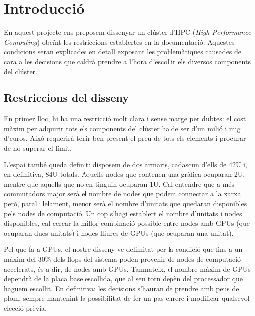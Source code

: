 \section{Introducció}

En aquest projecte ens proposem dissenyar un clúster d'HPC (\textit{High Performance Computing}) obeïnt les restriccions establertes en la documentació. Aquestes condicions seran explicades en detall exposant les problemàtiques causades de cara a les decisions que caldrà prendre a l'hora d'escollir els diversos components del clúster.

\subsection{Restriccions del disseny}
En primer lloc, hi ha una restricció molt clara i sense marge per dubtes: el cost màxim per adquirir tots els components del clúster ha de ser d'un milió i mig d'euros. Això requerirà tenir ben present el preu de tots els elements i procurar de no superar el límit.

L'espai també queda definit: disposem de dos armaris, cadascun d'ells de 42U i, en definitiva, 84U totals. Aquells nodes que contenen una gràfica ocuparan 2U, mentre que aquells que no en tinguin ocuparan 1U. Cal entendre que a més commutadors major serà el nombre de nodes que podem connectar a la xarxa però, paral·lelament, menor serà el nombre d'unitats que quedaran disponibles pels nodes de computació. Un cop s'hagi establert el nombre d'unitats i nodes disponibles, cal cercar la millor combinació possible entre nodes amb GPUs (que ocuparan dues unitats) i nodes lliures de GPUs (que ocuparan una unitat).

Pel que fa a GPUs, el nostre disseny ve delimitat per la condició que fins a un màxim del 30\% dels flops del sistema poden provenir de nodes de computació accelerats, és a dir, de nodes amb GPUs. Tanmateix, el nombre màxim de GPUs dependrà de la placa base escollida, que al seu torn depèn del processador que haguem escollit. En definitiva: les decisions s'hauran de prendre amb peus de plom, sempre mantenint la possibilitat de fer un pas enrere i modificar qualsevol elecció prèvia.



